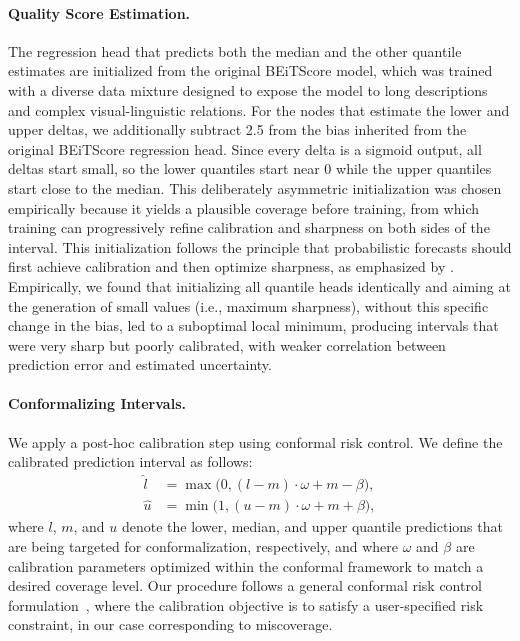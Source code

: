 \documentclass[11pt]{article}
\begin{document}
\paragraph{Quality Score Estimation.} The regression head that predicts both the median and the other quantile estimates are initialized from the original BEiTScore model, which was trained with a diverse data mixture designed to expose the model to long descriptions and complex visual-linguistic relations. For the nodes that estimate the lower and upper deltas, we additionally subtract 2.5 from the bias inherited from the original BEiTScore regression head. Since every delta is a sigmoid output, all deltas start small, so the lower quantiles start near 0 while the upper quantiles start close to the median. This deliberately asymmetric initialization was chosen empirically because it yields a plausible coverage before training, from which training can progressively refine calibration and sharpness on both sides of the interval. This initialization follows the principle that probabilistic forecasts should first achieve calibration and then optimize sharpness, as emphasized by \citet{gneiting2007strictly}. Empirically, we found that initializing all quantile heads identically and aiming at the generation of small values (i.e., maximum sharpness), without this specific change in the bias, led to a suboptimal local minimum, producing intervals that were very sharp but poorly calibrated, with weaker correlation between prediction error and estimated uncertainty.

\paragraph{Conformalizing Intervals.} We apply a post-hoc calibration step using conformal risk control. We define the calibrated prediction interval as follows:
\begin{align}
    \hat{l} &= \max\bigl(0, (l-m)\cdot\omega + m - \beta\bigr), \label{eq:cal_lower} \\
    \hat{u} &= \min\bigl(1, (u-m)\cdot\omega + m + \beta\bigr), \label{eq:cal_upper}
\end{align}
where \(l\), \(m\), and \(u\) denote the lower, median, and upper quantile predictions that are being targeted for conformalization, respectively, and where \(\omega\) and \(\beta\) are calibration parameters optimized within the conformal framework to match a desired coverage level. Our procedure follows a general conformal risk control formulation~\cite{angelopoulos2022conformal,gomes2025conformal}, where the calibration objective is to satisfy a user-specified risk constraint, in our case corresponding to miscoverage.
\end{document}
